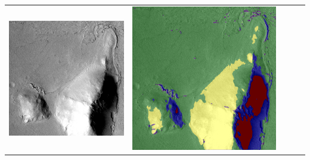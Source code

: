 \begin{table}[h!]
\begin{tabularx}{\textwidth}{>{\centering}m{}
			>{\centering}m{}
			>{\centering}m{}
			>{\centering}m{}
			>{\centering\arraybackslash}m{}}
		\includegraphics[width=0.9\linewidth]{images/p03/p03_04.png} &
		\includegraphics[width=0.9\linewidth]{images/gen/pooling_layers/p03_04.png_1.png} &

\end{tabularx}
\end{table}
